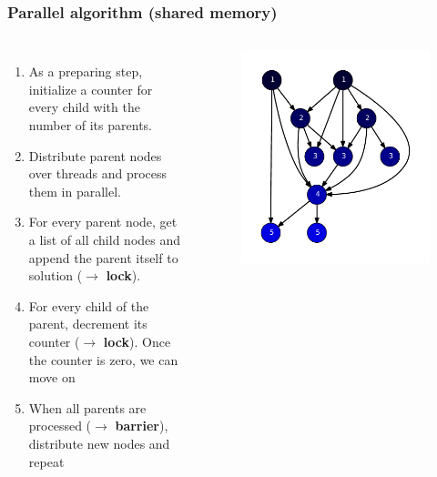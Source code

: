 \begin{frame}
\frametitle{Parallel algorithm (shared memory)}
\begin{columns}[c]
  \begin{enumerate}
    \item As a preparing step, initialize a counter for every child with the number of its parents.
    \item Distribute parent nodes over threads and process them in parallel.
    \item For every parent node, get a list of all child nodes and append the parent itself to solution ($\rightarrow$ \textbf{lock}).
    \item For every child of the parent, decrement its counter ($\rightarrow$ \textbf{lock}). Once the counter is zero, we can move on
    \item When all parents are processed ($\rightarrow$ \textbf{barrier}), distribute new nodes and repeat
  \end{enumerate}

  \begin{figure}[!ht]
    \begin{center}
      \includegraphics[width=\textwidth]{img/software10.pdf}
    \end{center}
  \end{figure}
\end{columns}

\end{frame}


